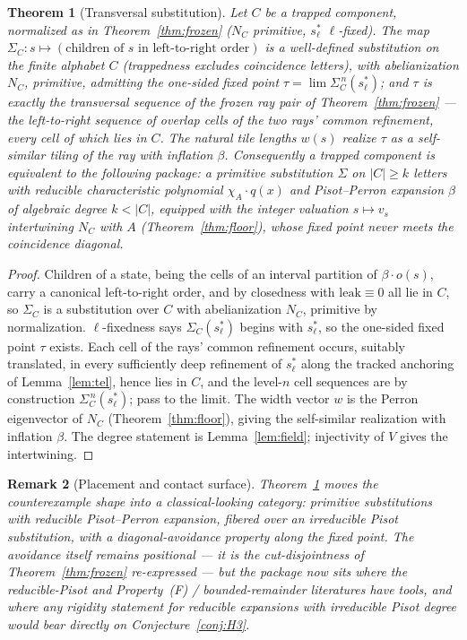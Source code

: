 \documentclass[11pt]{article}
\newtheorem{theorem}{Theorem}[section]
\newtheorem{remark}[theorem]{Remark}
\begin{document}
\begin{theorem}[Transversal substitution]\label{thm:transversal}
Let $C$ be a trapped component, normalized as in
Theorem~\ref{thm:frozen} ($N_C$ primitive, $s^{*}_{\ell}$
$\ell$-fixed). The map $\Sigma_C\colon s\mapsto(\text{children of }s
\text{ in left-to-right order})$ is a well-defined substitution on the
finite alphabet $C$ (trappedness excludes coincidence letters), with
abelianization $N_C$, primitive, admitting the one-sided fixed point
$\tau=\lim\Sigma_C^{\,n}(s^{*}_{\ell})$; and $\tau$ is exactly the
transversal sequence of the frozen ray pair of
Theorem~\ref{thm:frozen} --- the left-to-right sequence of overlap
cells of the two rays' common refinement, every cell of which lies in
$C$. The natural tile lengths $w(s)$ realize $\tau$ as a self-similar
tiling of the ray with inflation $\beta$. Consequently a trapped
component is equivalent to the following package: a primitive
substitution $\Sigma$ on $|C|\ge k$ letters with reducible
characteristic polynomial $\chi_A\cdot q(x)$ and Pisot--Perron
expansion $\beta$ of algebraic degree $k<|C|$, equipped with the
integer valuation $s\mapsto v_s$ intertwining $N_C$ with $A$
(Theorem~\ref{thm:floor}), whose fixed point never meets the
coincidence diagonal.
\end{theorem}

\begin{proof}
Children of a state, being the cells of an interval partition of
$\beta\cdot o(s)$, carry a canonical left-to-right order, and by
closedness with $\mathrm{leak}\equiv0$ all lie in $C$, so $\Sigma_C$
is a substitution over $C$ with abelianization $N_C$, primitive by
normalization. $\ell$-fixedness says $\Sigma_C(s^{*}_{\ell})$ begins
with $s^{*}_{\ell}$, so the one-sided fixed point $\tau$ exists. Each
cell of the rays' common refinement occurs, suitably translated, in
every sufficiently deep refinement of $s^{*}_{\ell}$ along the tracked
anchoring of Lemma~\ref{lem:tel}, hence lies in $C$, and the level-$n$
cell sequences are by construction $\Sigma_C^{\,n}(s^{*}_{\ell})$;
pass to the limit. The width vector $w$ is the Perron eigenvector of
$N_C$ (Theorem~\ref{thm:floor}), giving the self-similar realization
with inflation $\beta$. The degree statement is
Lemma~\ref{lem:field}; injectivity of $V$ gives the intertwining.
\end{proof}

\begin{remark}[Placement and contact surface]\label{rem:transplace}
Theorem~\ref{thm:transversal} moves the counterexample shape into a
classical-looking category: primitive substitutions with reducible
Pisot--Perron expansion, fibered over an irreducible Pisot
substitution, with a diagonal-avoidance property along the fixed
point. The avoidance itself remains positional --- it is the
cut-disjointness of Theorem~\ref{thm:frozen} re-expressed --- but the
package now sits where the reducible-Pisot and Property~(F) /
bounded-remainder literatures have tools, and where any rigidity
statement for reducible expansions with irreducible Pisot degree would
bear directly on Conjecture~\ref{conj:H3}.
\end{remark}
\end{document}
